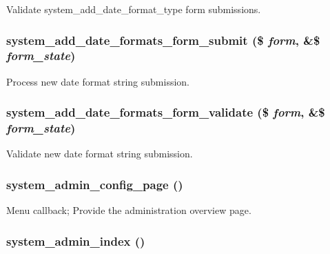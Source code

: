 \label{system_8admin_8inc_a527ad46f9809b020fc60a532b6cdaed9}
Validate system\_\-add\_\-date\_\-format\_\-type form submissions. \hypertarget{system_8admin_8inc_a4da8cb843f179d159b7183d2eb37d8d3}{
\subsubsection[{system\_\-add\_\-date\_\-formats\_\-form\_\-submit}]{\setlength{\rightskip}{0pt plus 5cm}system\_\-add\_\-date\_\-formats\_\-form\_\-submit (\$ {\em form}, \/  \&\$ {\em form\_\-state})}}
\label{system_8admin_8inc_a4da8cb843f179d159b7183d2eb37d8d3}
Process new date format string submission. \hypertarget{system_8admin_8inc_a5f6ba1a50bf018a1218b2d42eca5ce06}{
\subsubsection[{system\_\-add\_\-date\_\-formats\_\-form\_\-validate}]{\setlength{\rightskip}{0pt plus 5cm}system\_\-add\_\-date\_\-formats\_\-form\_\-validate (\$ {\em form}, \/  \&\$ {\em form\_\-state})}}
\label{system_8admin_8inc_a5f6ba1a50bf018a1218b2d42eca5ce06}
Validate new date format string submission. \hypertarget{system_8admin_8inc_a5da84f893a839fab8b3d748ecb52de9d}{
\subsubsection[{system\_\-admin\_\-config\_\-page}]{\setlength{\rightskip}{0pt plus 5cm}system\_\-admin\_\-config\_\-page ()}}
\label{system_8admin_8inc_a5da84f893a839fab8b3d748ecb52de9d}
Menu callback; Provide the administration overview page. \hypertarget{system_8admin_8inc_a89bec592ed801dd4eb6f50c450e4d54e}{
\subsubsection[{system\_\-admin\_\-index}]{\setlength{\rightskip}{0pt plus 5cm}system\_\-admin\_\-index ()}}
